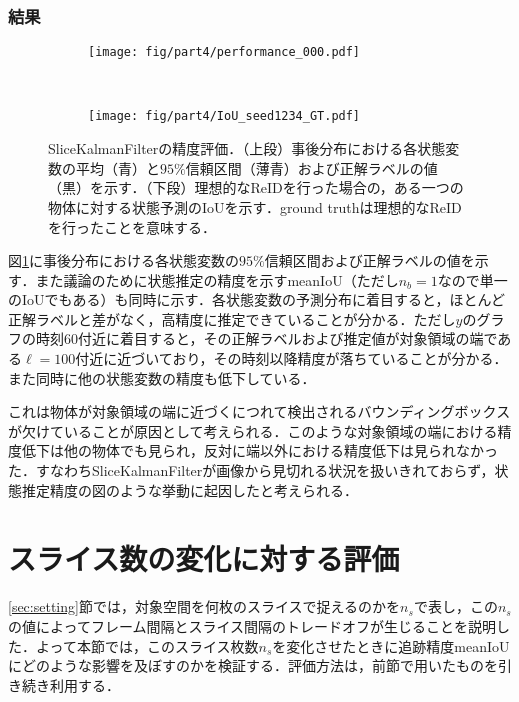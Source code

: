         \subsubsection{結果}

        \begin{figure}[t]
            \begin{subfigure}[t]{\linewidth}
                \centering
                \texttt{[image: fig/part4/performance\_000.pdf]}
            \end{subfigure}
            \\
            \begin{subfigure}[t]{\linewidth}
                \centering
                \texttt{[image: fig/part4/IoU\_seed1234\_GT.pdf]}
            \end{subfigure}
            \caption[SliceKalmanFilterの精度評価]{SliceKalmanFilterの精度評価．（上段）事後分布における各状態変数の平均（青）と$95\%$信頼区間（薄青）および正解ラベルの値（黒）を示す．（下段）理想的なReIDを行った場合の，ある一つの物体に対する状態予測のIoUを示す．ground truthは理想的なReIDを行ったことを意味する．}
            \label{fig:SKF_evaluation}
        \end{figure}

        図\ref{fig:SKF_evaluation}に事後分布における各状態変数の$95\%$信頼区間および正解ラベルの値を示す．また議論のために状態推定の精度を示すmeanIoU（ただし$n_b = 1$なので単一のIoUでもある）も同時に示す．各状態変数の予測分布に着目すると，ほとんど正解ラベルと差がなく，高精度に推定できていることが分かる．ただし$y$のグラフの時刻$60$付近に着目すると，その正解ラベルおよび推定値が対象領域の端である$\ell = 100$付近に近づいており，その時刻以降精度が落ちていることが分かる．また同時に他の状態変数の精度も低下している．

        これは物体が対象領域の端に近づくにつれて検出されるバウンディングボックスが欠けていることが原因として考えられる．このような対象領域の端における精度低下は他の物体でも見られ，反対に端以外における精度低下は見られなかった．すなわちSliceKalmanFilterが画像から見切れる状況を扱いきれておらず，状態推定精度の図のような挙動に起因したと考えられる．

\section{スライス数の変化に対する評価}
\label{sec:number_of_slice_effect}

\ref{sec:setting}節では，対象空間を何枚のスライスで捉えるのかを$n_s$で表し，この$n_s$の値によってフレーム間隔とスライス間隔のトレードオフが生じることを説明した．よって本節では，このスライス枚数$n_s$を変化させたときに追跡精度meanIoUにどのような影響を及ぼすのかを検証する．評価方法は，前節で用いたものを引き続き利用する．

